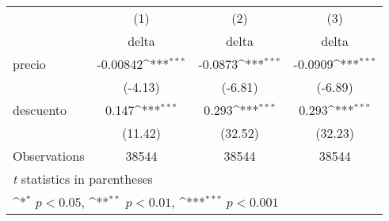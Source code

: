 {
\def\sym#1{\ifmmode^{#1}\else\(^{#1}\)\fi}
\begin{tabular}{l*{3}{c}}
\hline\hline
                    &\multicolumn{1}{c}{(1)}&\multicolumn{1}{c}{(2)}&\multicolumn{1}{c}{(3)}\\
                    &\multicolumn{1}{c}{delta}&\multicolumn{1}{c}{delta}&\multicolumn{1}{c}{delta}\\
\hline
precio              &    -0.00842\sym{***}&     -0.0873\sym{***}&     -0.0909\sym{***}\\
                    &     (-4.13)         &     (-6.81)         &     (-6.89)         \\
[1em]
descuento           &       0.147\sym{***}&       0.293\sym{***}&       0.293\sym{***}\\
                    &     (11.42)         &     (32.52)         &     (32.23)         \\
\hline
Observations        &       38544         &       38544         &       38544         \\
\hline\hline
\multicolumn{4}{l}{\footnotesize \textit{t} statistics in parentheses}\\
\multicolumn{4}{l}{\footnotesize \sym{*} \(p<0.05\), \sym{**} \(p<0.01\), \sym{***} \(p<0.001\)}\\
\end{tabular}
}
